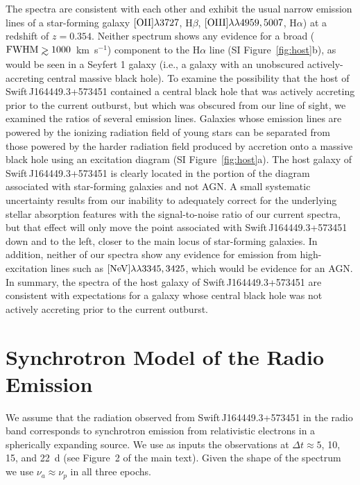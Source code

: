 The spectra are consistent with each other and exhibit the usual
narrow emission lines of a star-forming galaxy ${\rm [OII]}\lambda
3727$, H$\beta$, ${\rm [OIII]}\lambda\lambda 4959,5007$, H$\alpha$) at
a redshift of $z=0.354$.  Neither spectrum shows any evidence for a
broad (${\rm FWHM}\simgt 1000$~km~s$^{-1}$) component to the H$\alpha$
line (SI Figure~\ref{fig:host}b), as would be seen in a
Seyfert 1 galaxy (i.e., a galaxy with an unobscured actively-accreting
central massive black hole).  To examine the possibility that the host
of Swift\,J164449.3+573451 contained a central black hole that was
actively accreting prior to the current outburst, but which was
obscured from our line of sight, we examined the ratios of several
emission lines.  Galaxies whose emission lines are powered by the
ionizing radiation field of young stars can be separated from those
powered by the harder radiation field produced by accretion onto a
massive black hole using an excitation diagram\cite{bpt81} (SI
Figure~\ref{fig:host}a).  The host galaxy of Swift\,J164449.3+573451
is clearly located in the portion of the diagram associated with
star-forming galaxies and not AGN.  A small systematic uncertainty
results from our inability to adequately correct for the underlying
stellar absorption features with the signal-to-noise ratio of our
current spectra, but that effect will only move the point associated
with Swift\,J164449.3+573451 down and to the left, closer to the main
locus of star-forming galaxies.  In addition, neither of our spectra
show any evidence for emission from high-excitation lines such as
${\rm [NeV]}\lambda\lambda 3345,3425$, which would be evidence for an
AGN.  In summary, the spectra of the host galaxy of
Swift\,J164449.3+573451 are consistent with expectations for a galaxy
whose central black hole was not actively accreting prior to the
current outburst.


\section{Synchrotron Model of the Radio Emission}
\label{sec:synch}

We assume that the radiation observed from Swift\,J164449.3+573451 in
the radio band corresponds to synchrotron emission from relativistic
electrons in a spherically expanding source.  We use as inputs the
observations at $\Delta t\approx 5$, 10, 15, and 22~d (see Figure~2 of
the main text).  Given the shape of the spectrum we use $\nu_a\approx
\nu_p$ in all three epochs.

